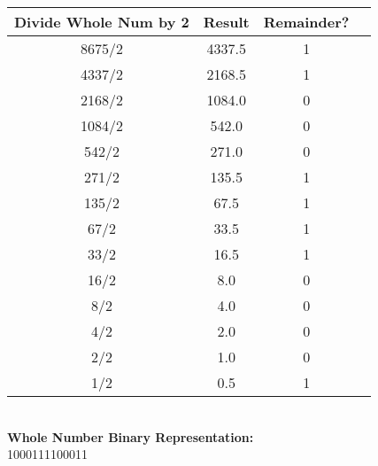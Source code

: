 \documentclass[12pt]{article}
\begin{document}
	
	\begin{center}
		
		\begin{tabular}{ |c|c|c|c| } 
			\hline
			\textbf{Divide Whole Num by 2} & \textbf{Result} & \textbf{Remainder?}  \\
			\hline
			8675/2  & 4337.5  &  1 \\ 
			\hline
			4337/2  & 2168.5  &  1 \\ 
			\hline
			2168/2  & 1084.0  &  0 \\ 
			\hline
			1084/2  & 542.0   &  0 \\
			\hline
			542/2   & 271.0   &  0 \\
			\hline
			271/2   & 135.5   &  1 \\
			\hline
			135/2   & 67.5    &  1 \\
			\hline
			67/2    & 33.5    &  1 \\
			\hline
			33/2    & 16.5    &  1 \\
			\hline
			16/2    & 8.0     &  0 \\
			\hline
			8/2     & 4.0     &  0 \\
			\hline
			4/2     & 2.0     &  0 \\
			\hline
			2/2     & 1.0     &  0 \\
			\hline
			1/2     & 0.5     &  1 \\
			\hline
		\end{tabular} \vspace{0.4cm} \\
		
		
		
		\textbf{Whole Number Binary Representation:} \\
		1000111100011 \vspace{1cm} \\
		

\end{center}
\end{document}
